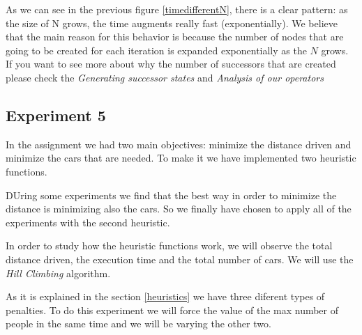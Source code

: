 \documentclass[12]{article}
\begin{document}
As we can see in the previous figure \ref{timedifferentN}, there is a clear pattern: as the size of N grows, the time augments really fast (exponentially). We believe that the main reason for this behavior is because the number of nodes that are going to be created for each iteration is expanded exponentially as the $N$ grows. If you want to see more about why the number of successors that are created please check the \textit{Generating successor states} and \textit{Analysis of our operators}



\subsection{Experiment 5}
In the assignment we had two main objectives: minimize the distance driven and minimize the cars that are needed. To make it we have implemented two heuristic functions. 

DUring some experiments we find that the best way in order to minimize the distance is minimizing also the cars. So we finally have chosen to apply all of the experiments with the second heuristic.

In order to study how the heuristic functions work, we will observe the total distance driven, the execution time and the total number of cars. We will use the \textit{Hill Climbing} algorithm.

As it is explained in the section \ref{heuristics} we have three diferent types of penalties. To do this experiment we will force the value of the max number of people in the same time and we will be varying the other two.

\end{document}
